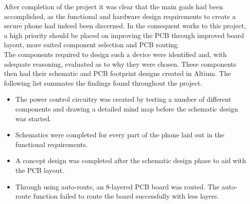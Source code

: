 	After completion of the project it was clear that the main goals had been accomplished, as the functional and hardware design requirements to create a secure phone had indeed been discerned. In the consequent works to this project, a high priority should be placed on improving the PCB through improved board layout, more suited component selection and PCB routing. \\
The components required to design such a device were identified and, with adequate reasoning, evaluated as to why they were chosen. 
These components then had their schematic and PCB footprint designs created in Altium. 
The following list summates the findings found throughout the project.\\

\begin{itemize}
\item The power control circuitry was created by testing a number of different components and drawing a detailed mind map before the schematic design was started.
\item Schematics were completed for every part of the phone laid out in the functional requirements.
\item A concept design was completed after the schematic design phase to aid with the PCB layout. 
\item Through using auto-route, an 8-layered PCB board was routed. 
The auto-route function failed to route the board successfully with less layers. 
\end{itemize}






